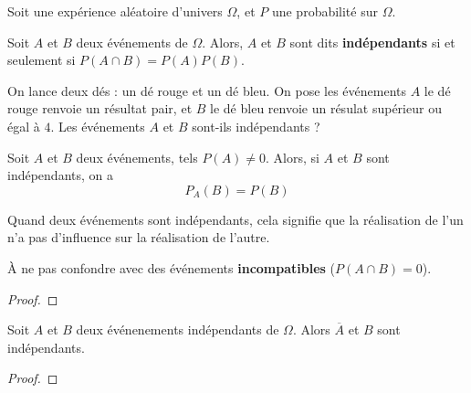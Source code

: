 \documentclass{article}
\begin{document}
\begin{tcolorbox}
\begin{definition}
Soit une expérience aléatoire d'univers $\Omega$, et $P$ une probabilité sur $\Omega$.

Soit $A$ et $B$ deux événements de $\Omega$. Alors, $A$ et $B$ sont dits \textbf{indépendants} si et seulement si $P(A \cap B) = P(A)P(B)$.
\end{definition}
\end{tcolorbox}
\begin{example}
On lance deux dés : un dé rouge et un dé bleu. On pose les événements $A$ \og le dé rouge renvoie un résultat pair\fg, et $B$ \og le dé bleu renvoie un résulat supérieur ou égal à $4$\fg. Les événements $A$ et $B$ sont-ils indépendants ?
\vspace*{0.5cm}

\emptybox{2cm}
\end{example}
\begin{proposition}
Soit $A$ et $B$ deux événements, tels $P(A) \neq 0$. Alors, si $A$ et $B$ sont indépendants, on a
\begin{equation*}
P_A(B) = P(B)
\end{equation*}
\end{proposition}
\begin{remark}
Quand deux événements sont indépendants, cela signifie que la réalisation de l'un n'a pas d'influence sur la réalisation de l'autre.

À ne pas confondre avec des événements \textbf{incompatibles} ($P(A \cap B) = 0$).
\end{remark}
\begin{proof}
\hfill
\vspace*{0.5cm}
\hfill

\emptybox{3cm}
\end{proof}
\begin{proposition}
Soit $A$ et $B$ deux événenements indépendants de $\Omega$. Alors $\overbar{A}$ et $B$ sont indépendants.
\end{proposition}
\begin{proof}
\hfill
\vspace*{0.5cm}
\hfill

\emptybox{3cm}
\end{proof}
\end{document}

